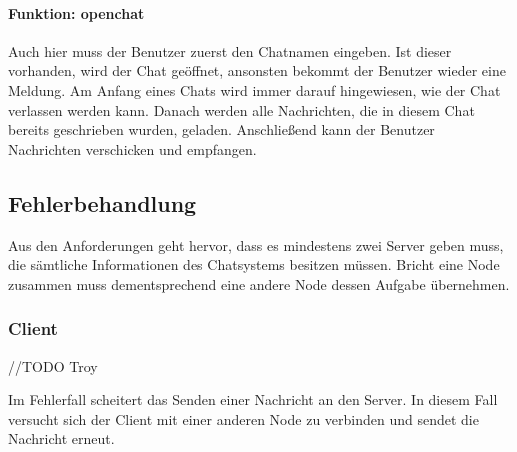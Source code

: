\paragraph{Funktion: openchat}
Auch hier muss der Benutzer zuerst den Chatnamen eingeben. Ist dieser vorhanden, wird der Chat geöffnet, ansonsten
bekommt der Benutzer wieder eine Meldung. Am Anfang eines Chats wird immer darauf hingewiesen, wie der Chat
verlassen werden kann. Danach werden alle Nachrichten, die in diesem Chat bereits geschrieben wurden, geladen.
Anschließend kann der Benutzer Nachrichten verschicken und empfangen.

\author{Matthias Vonend, Aaron Schweig, Troy Keßler}
\subsection{Fehlerbehandlung}
Aus den Anforderungen geht hervor, dass es mindestens zwei Server geben muss, die sämtliche Informationen des
Chatsystems besitzen müssen. Bricht eine Node zusammen muss dementsprechend eine andere Node dessen Aufgabe übernehmen.

\subsubsection{Client}
//TODO Troy

Im Fehlerfall scheitert das Senden einer Nachricht an den Server. In diesem Fall versucht sich der Client mit
einer anderen Node zu verbinden und sendet die Nachricht erneut.

